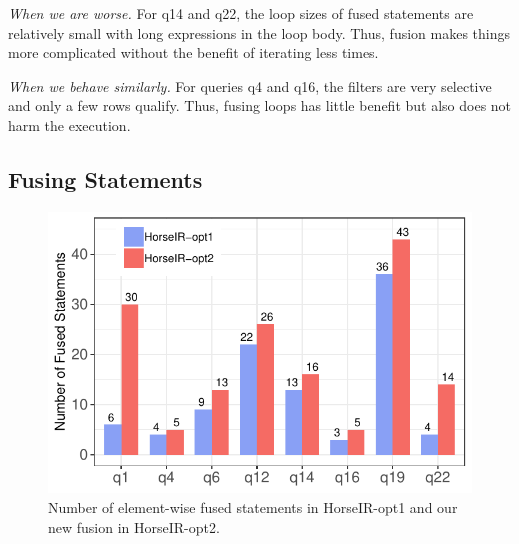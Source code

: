 \textit{When we are worse.}
For q14 and q22, the loop sizes of fused statements are relatively small with
long expressions in the loop body. Thus, fusion makes things more complicated
without the benefit of iterating less times. 

\textit{When we behave similarly.}
For queries q4 and q16, the filters are very selective and only a few rows
qualify. Thus, fusing loops has little benefit but also does not harm the
execution.






\subsection{Fusing Statements} \label{fusing_stmts}

\begin{figure}[htbp]
\centering
\includegraphics[width=.9\columnwidth]{./src/figure/bar-number.pdf}
\caption{Number of element-wise fused statements in HorseIR-opt1 and our new
fusion in HorseIR-opt2.}
\label{fig:opt_number}
\end{figure}

